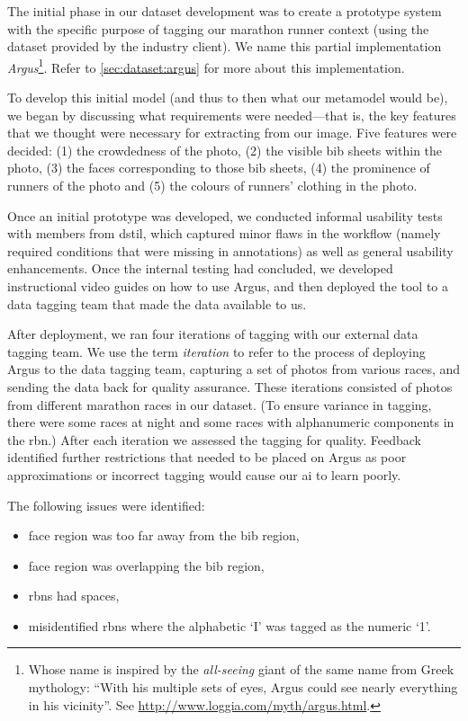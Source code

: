 The initial phase in our dataset development was to create a prototype system with the specific purpose of tagging our marathon runner context (using the dataset provided by the industry client). We name this partial implementation \textit{Argus}\footnote{Whose name is inspired by the \textit{all-seeing} giant of the same name from Greek mythology: ``With his multiple sets of eyes, Argus could see nearly everything in his vicinity''. See \url{http://www.loggia.com/myth/argus.html}.}. Refer to \cref{sec:dataset:argus} for more about this implementation. 

To develop this initial model (and thus to then what our metamodel would be), we began by discussing what requirements were needed---that is, the key features that we thought were necessary for extracting from our image. Five features were decided: (1) the crowdedness of the photo, (2) the visible bib sheets within the photo, (3) the faces corresponding to those bib sheets, (4) the prominence of runners of the photo and (5) the colours of runners' clothing in the photo.

Once an initial prototype was developed, we conducted informal usability tests with members from \gls{dstil}, which captured minor flaws in the workflow (namely required conditions that were missing in annotations) as well as general usability enhancements. Once the internal testing had concluded, we developed instructional video guides on how to use Argus, and then deployed the tool to a data tagging team that made the data available to us.

After deployment, we ran four iterations of tagging with our external data tagging team. We use the term \textit{iteration} to refer to the process of deploying Argus to the data tagging team, capturing a set of photos from various races, and sending the data back for quality assurance. These iterations consisted of photos from different marathon races in our dataset. (To ensure variance in tagging, there were some races at night and some races with alphanumeric components in the \gls{rbn}.) After each iteration we assessed the tagging for quality. Feedback identified further restrictions that needed to be placed on Argus as poor approximations or incorrect tagging would cause our \gls{ai} to learn poorly. 

The following issues were identified:

\begin{itemize}
  \item face region was too far away from the bib region,
  \item face region was overlapping the bib region,
  \item \glspl{rbn} had spaces,
  \item misidentified \glspl{rbn} where the alphabetic `I' was tagged as the numeric `1'.
\end{itemize}

